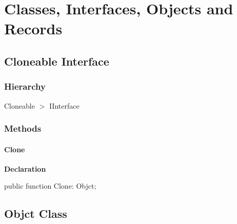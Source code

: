 \documentclass{report}
\newif\ifpdf
\begin{document}
\section{Classes, Interfaces, Objects and Records}
\ifpdf
\subsection*{\large{\textbf{Cloneable Interface}}\normalsize\hspace{1ex}\hrulefill}
\else
\subsection*{Cloneable Interface}
\fi
\label{NewPascal.Base.Cloneable}
\subsubsection*{\large{\textbf{Hierarchy}}\normalsize\hspace{1ex}\hfill}
Cloneable {$>$} IInterface
\subsubsection*{\large{\textbf{Methods}}\normalsize\hspace{1ex}\hfill}
\paragraph*{Clone}\hspace*{\fill}

\label{NewPascal.Base.Cloneable-Clone}
\begin{list}{}{
\setlength{\itemindent}{0cm}
\setlength{\listparindent}{0cm}
\setlength{\leftmargin}{\evensidemargin}
\addtolength{\leftmargin}{\tmplength}
\settowidth{\labelsep}{X}
\addtolength{\leftmargin}{\labelsep}
\setlength{\labelwidth}{\tmplength}
}
\item[\textbf{Declaration}\hfill]
\ifpdf
\begin{flushleft}
\fi
\begin{ttfamily}
public function Clone: Objct;\end{ttfamily}

\ifpdf
\end{flushleft}
\fi

\end{list}
\ifpdf
\subsection*{\large{\textbf{Objct Class}}\normalsize\hspace{1ex}\hrulefill}
\else
\end{document}
